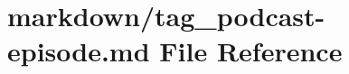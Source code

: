 \hypertarget{tag__podcast-episode_8md}{}\section{markdown/tag\+\_\+podcast-\/episode.md File Reference}
\label{tag__podcast-episode_8md}
